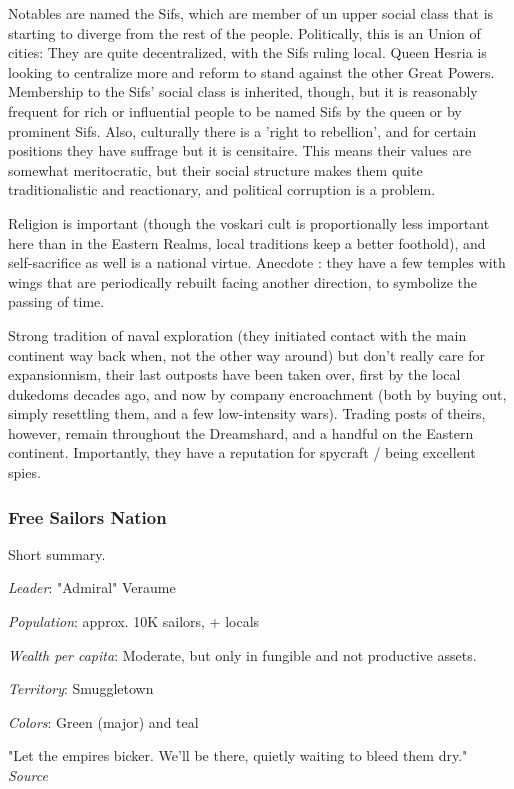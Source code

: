 Notables are named the Sifs, which are member of un upper social class that is starting to diverge from the rest of the people. Politically, this is an Union of cities: They are quite decentralized, with the Sifs ruling local. Queen Hesria is looking to centralize more and reform to stand against the other Great Powers. Membership to the Sifs' social class is inherited, though, but it is reasonably frequent for rich or influential people to be named Sifs by the queen or by prominent Sifs. Also, culturally there is a 'right to rebellion', and for certain positions they have suffrage but it is censitaire. This means their values are somewhat meritocratic, but their social structure makes them quite traditionalistic and reactionary, and political corruption is a problem.

Religion is important (though the voskari cult is proportionally less important here than in the Eastern Realms, local traditions keep a better foothold), and self-sacrifice as well is a national virtue. Anecdote : they have a few temples with wings that are periodically rebuilt facing another direction, to symbolize the passing of time.

Strong tradition of naval exploration (they initiated contact with the main continent way back when, not the other way around) but don't really care for expansionnism, their last outposts have been taken over, first by the local dukedoms decades ago, and now by company encroachment (both by buying out, simply resettling them, and a few low-intensity wars). Trading posts of theirs, however, remain throughout the Dreamshard, and a handful on the Eastern continent. Importantly, they have a reputation for spycraft / being excellent spies.


\subsubsection{Free Sailors Nation}

Short summary.

\textit{Leader}: "Admiral" Veraume

\textit{Population}: approx. 10K sailors, + locals

\textit{Wealth per capita}: Moderate, but only in fungible and not productive assets.

\textit{Territory}: Smuggletown
    
\textit{Colors}: Green (major) and teal

\begin{rpg-quotebox}
    "Let the empires bicker. We'll be there, quietly waiting to bleed them dry." \\ \textendash \textit{Source}
\end{rpg-quotebox}


